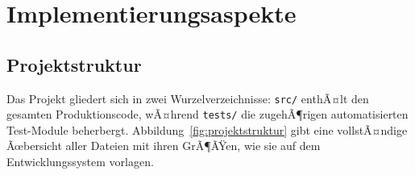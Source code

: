 ﻿\documentclass[a4paper,12pt]{report}
\theoremstyle{definition}
\begin{document}
\chapter{Implementierungsaspekte}

\section{Projektstruktur}
\label{subsec:projektstruktur}

Das Projekt gliedert sich in zwei Wurzelverzeichnisse:
\texttt{src/} enthÃ¤lt den gesamten Produktionscode, wÃ¤hrend
\texttt{tests/} die zugehÃ¶rigen automatisierten Test-Module
beherbergt. Abbildung~\ref{fig:projektstruktur} gibt eine
vollstÃ¤ndige Ãœbersicht aller Dateien mit ihren GrÃ¶ÃŸen, wie
sie auf dem Entwicklungssystem vorlagen.

\newcommand{\treemid}{\texttt{|--~}}   %
\newcommand{\treeend}{\texttt{`--~}}   %
\end{document}

